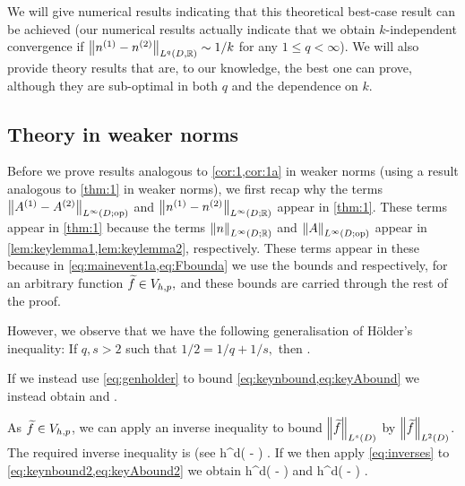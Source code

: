 We will give numerical results indicating that this theoretical best-case result can be achieved (our numerical results actually indicate that we obtain $k$-independent convergence if $\NLqDRR{\nso-\nst}\sim 1/k$ for any $1 \leq q < \infty$). We will also provide theory results that are, to our knowledge, the best one can prove, although they are sub-optimal in both $q$ and the dependence on $k.$


\subsection{Theory in weaker norms}\label{sec:weakertheory}
Before we prove results analogous to \cref{cor:1,cor:1a} in weaker norms (using a result analogous to \cref{thm:1} in weaker norms), we first recap why the terms  $\NLiDRRdtd{\Aso-\Ast}$ and $\NLiDRR{\nso-\nst}$ appear in \cref{thm:1}. These terms appear in \cref{thm:1} because the terms $\NLiDRR{n}$ and $\NLiDRRdtd{A}$ appear in \cref{lem:keylemma1,lem:keylemma2}, respectively. These terms appear in these  because in \cref{eq:mainevent1a,eq:Fbounda} we use the bounds
\beq\label{eq:keynbound}
 \leq {}\NLtD{\ftilde}
\eeq
and
\beq\label{eq:keyAbound}
 \leq {}\NLtD{\grad \ftilde}
\eeq
respectively, for an arbitrary function $\widetilde{f} \in V_{h,p},$ and these bounds are carried through the rest of the proof.

However, we observe that we have the following generalisation of H\"older's inequality: If $q,s > 2$ such that $1/2 = 1/q+1/s,$ then
\beq\label{eq:genholder}
\NLtD{\vo\vt} \leq \NLqD{\vo}\NLsD{\vt}.
\eeq

If we instead use \cref{eq:genholder} to bound \cref{eq:keynbound,eq:keyAbound} we instead obtain
\beq\label{eq:keynbound2}
 \leq {}\NLsD{\ftilde}
\eeq
and
\beq\label{eq:keyAbound2}
 \leq {}\NLsD{\ftilde}.
\eeq

As $\widetilde{f} \in V_{h,p}$, we can apply an inverse inequality to bound $\NLsD{\ftilde}$ by $\NLtD{\ftilde}$. The required inverse inequality is (see \cite[Theorem 4.5.11 and Remark 4.5.20]{BrSc:08}
\beq\label{eq:inverses}
\NLsD{\ftilde} \leq \Cinvs h^{d\mleft( - \half\mright)} \NLtD{\ftilde}.
\eeq
If we then apply \cref{eq:inverses} to \cref{eq:keynbound2,eq:keyAbound2} we obtain
\beq\label{eq:keynboundfinal}
 \leq \Cinvs {} h^{d\mleft( - \half\mright)} \NLtD{\ftilde}
\eeq
and
\beq\label{eq:keyAboundfinal}
 \leq \Cinvs {} h^{d\mleft( - \half\mright)} \NLtD{\grad\ftilde}.
\eeq

